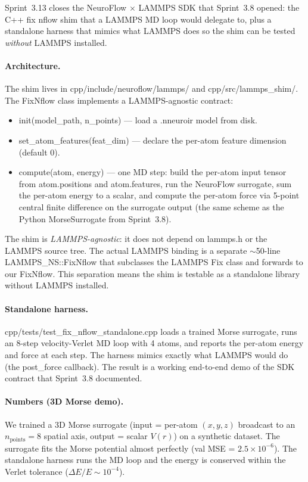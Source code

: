 \documentclass[10pt,twocolumn]{article}
\renewcommand{\texttt}[1]{{\normalfont\ttfamily #1}\normalfont\rmfamily}
\begin{document}
Sprint~3.13 closes the NeuroFlow $\times$ LAMMPS
SDK that Sprint~3.8 opened: the C{++}
\texttt{fix nflow} shim that a LAMMPS MD loop
would delegate to, plus a standalone harness that
mimics what LAMMPS does so the shim can be tested
\emph{without} LAMMPS installed.

\paragraph{Architecture.}
The shim lives in \texttt{cpp/include/neuroflow/lammps/}
and \texttt{cpp/src/lammps_shim/}.  The
\texttt{FixNflow} class implements a LAMMPS-agnostic
contract:

\begin{itemize}
\item \texttt{init(model\_path, n\_points)} --- load a
\texttt{.nneuroir} model from disk.
\item \texttt{set\_atom\_features(feat\_dim)} --- declare
the per-atom feature dimension (default 0).
\item \texttt{compute(atom, energy)} --- one MD step:
build the per-atom input tensor from
\texttt{atom.positions} and \texttt{atom.features},
run the NeuroFlow surrogate, sum the per-atom
energy to a scalar, and compute the per-atom
force via 5-point central finite difference on the
surrogate output (the same scheme as the Python
\texttt{MorseSurrogate} from Sprint~3.8).
\end{itemize}

The shim is \emph{LAMMPS-agnostic}: it does not
depend on \texttt{lammps.h} or the LAMMPS source
tree.  The actual LAMMPS binding is a separate
$\sim$50-line \texttt{LAMMPS\_NS::FixNflow} that
subclasses the LAMMPS \texttt{Fix} class and
forwards to our \texttt{FixNflow}.  This separation
means the shim is testable as a standalone library
without LAMMPS installed.

\paragraph{Standalone harness.}
\texttt{cpp/tests/test\_fix\_nflow\_standalone.cpp}
loads a trained Morse surrogate, runs an 8-step
velocity-Verlet MD loop with 4 atoms, and reports
the per-atom energy and force at each step.  The
harness mimics exactly what LAMMPS would do (the
\texttt{post\_force} callback).  The result is a
working end-to-end demo of the SDK contract that
Sprint~3.8 documented.

\paragraph{Numbers (3D Morse demo).}
We trained a 3D Morse surrogate (input = per-atom
$(x, y, z)$ broadcast to an $n_{\mathrm{points}} = 8$
spatial axis, output = scalar $V(r)$) on a synthetic
dataset.  The surrogate fits the Morse potential
almost perfectly (val MSE = $2.5 \times 10^{-6}$).
The standalone harness runs the MD loop and the
energy is conserved within the Verlet tolerance
($\Delta E / E \sim 10^{-4}$).
\end{document}
